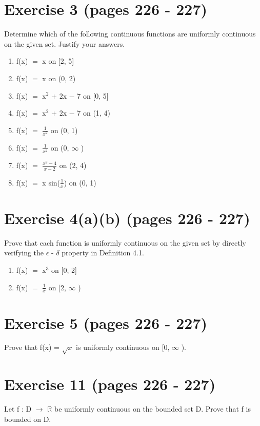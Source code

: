 \documentclass{article}
\newcommand{\mt}[1]{\ensuremath{#1}}
\newcommand\bsc[2][\DefaultOpt]{%
  \def\DefaultOpt{#2}%
  \section[#1]{#2}%
}
\newcommand{\balist}{\begin{enumerate}[label=\alph*.]}
\newcommand{\elist}{\end{enumerate}}
\newcommand{\br}{\mt{\mathbb{R}} }       %
\newcommand{\ep}{\mt{\epsilon} }         %
\newcommand{\dta}{\mt{\delta} }
\newcommand{\lra}{ \mt{\longrightarrow} } %
\newcommand{\ps}{\mt{+} }
\newcommand{\ms}{\mt{-} }
\newcommand{\eql}{\mt{=} }
\newcommand{\uf}[2]{#1\mt{^{#2}}}
\newcommand{\frc}[2]{\mt{\frac{#1}{#2}}}
\newcommand{\infy}{\mt{\infty} }
\begin{document}
\bsc{Exercise 3 (pages 226 - 227)}{

Determine which of the following continuous functions are uniformly continuous on the given set. Justify your answers.

\balist
\item f(x) \eql x on [2, 5]
\item f(x) \eql x on (0, 2)
\item f(x) \eql \uf{x}{2} \ps 2x \ms 7 on [0, 5]
\item f(x) \eql \uf{x}{2} \ps 2x \ms 7 on (1, 4)
\item f(x) \eql \frc{1}{x^2} on (0, 1)
\item f(x) \eql \frc{1}{x^2} on (0, \infy)
\item f(x) \eql \frc{x^2 - 4}{x - 2} on (2, 4)
\item f(x) \eql x sin(\frc{1}{x}) on (0, 1)
\elist

}
\bsc{Exercise 4(a)(b) (pages 226 - 227)}{
Prove that each function is uniformly continuous on the given set by directly verifying the \ep - \dta property in Definition 4.1.

\balist
\item f(x) \eql \uf{x}{3} on [0, 2]
\item f(x) \eql \frc{1}{x} on [2, \infy)
\elist

}
\bsc{Exercise 5 (pages 226 - 227)}{

Prove that f(x) = $\sqrt{x}$ is uniformly continuous on [0, \infy). 

}
\bsc{Exercise 11 (pages 226 - 227)}{

Let f : D \lra \br be uniformly continuous on the bounded set D. Prove that f is bounded on D. 
}
\end{document}

